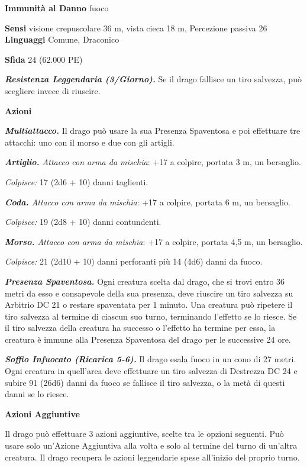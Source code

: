 \begin{multicols}{2}
\textbf{Immunità al Danno} fuoco

\textbf{Sensi} visione crepuscolare 36 m, vista cieca 18 m, Percezione passiva
26 \textbf{Linguaggi} Comune, Draconico

\textbf{Sfida} 24 (62.000 PE)

\emph{\textbf{Resistenza Leggendaria (3/Giorno).}} Se il drago fallisce
un tiro salvezza, può scegliere invece di riuscire.

\textbf{Azioni}

\emph{\textbf{Multiattacco.}} Il drago può usare la sua Presenza
Spaventosa e poi effettuare tre attacchi: uno con il morso e due con gli
artigli.

\emph{\textbf{Artiglio.} Attacco con arma da mischia}: +17 a colpire,
portata 3 m, un bersaglio.

\emph{Colpisce:} 17 (2d6 + 10) danni taglienti.

\emph{\textbf{Coda.} Attacco con arma da mischia}: +17 a colpire,
portata 6 m, un bersaglio.

\emph{Colpisce:} 19 (2d8 + 10) danni contundenti.

\emph{\textbf{Morso.} Attacco con arma da mischia}: +17 a colpire,
portata 4,5 m, un bersaglio.

\emph{Colpisce:} 21 (2d10 + 10) danni perforanti più 14 (4d6) danni da
fuoco.

\emph{\textbf{Presenza Spaventosa.}} Ogni creatura scelta dal drago, che
si trovi entro 36 metri da esso e consapevole della sua presenza, deve
riuscire un tiro salvezza su Arbitrio DC 21 o restare spaventata per 1
minuto. Una creatura può ripetere il tiro salvezza al termine di ciascun
suo turno, terminando l'effetto se lo riesce. Se il tiro salvezza della
creatura ha successo o l'effetto ha termine per essa, la creatura è
immune alla Presenza Spaventosa del drago per le successive 24 ore.

\emph{\textbf{Soffio Infuocato (Ricarica 5-6).}} Il drago esala fuoco in
un cono di 27 metri. Ogni creatura in quell'area deve effettuare un tiro
salvezza di Destrezza DC 24 e subire 91 (26d6) danni da fuoco se
fallisce il tiro salvezza, o la metà di questi danni se lo riesce.

\textbf{Azioni Aggiuntive}

Il drago può effettuare 3 azioni aggiuntive, scelte tra le opzioni
seguenti. Può usare solo un'Azione Aggiuntiva alla volta e solo al
termine del turno di un'altra creatura. Il drago recupera le azioni
leggendarie spese all'inizio del proprio turno.


\end{multicols}
